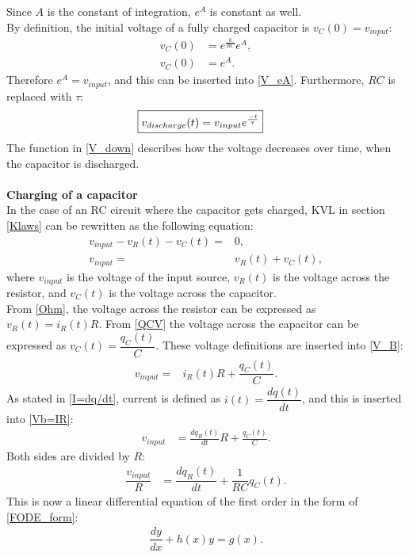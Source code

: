Since $A$ is the constant of integration, $e^A$ is constant as well.
\\
By definition, the initial voltage of a fully charged capacitor is $v_C(0)=v_{input}$:
 \begin{align*}
	v_C(0) &= e^{\frac{0}{RC}}e^A, \\
	v_C(0) &= e^A.
 \end{align*}
Therefore $e^A = v_{input}$, and this can be inserted into \eqref{V_eA}. Furthermore, $RC$ is replaced with $\tau$:
\begin{align}
\label{V_down}
\Aboxed{
 v_{discharge}(t) = v_{input}e^{\frac{-t}{\tau}}
 }
\end{align}
The function in \eqref{V_down} describes how the voltage decreases over time, when the capacitor is discharged.
\\
\\
\textbf{Charging of a capacitor}\\
In the case of an RC circuit where the capacitor gets charged, KVL in section \ref{Klaws} can be rewritten as the following equation:
\begin{align}
v_{input}-v_R(t)-v_C(t) =& 0, \nonumber \\
v_{input} =& v_R(t)+v_C(t), \label{V_B}
\end{align}
where $v_{input}$ is the voltage of the input source, $v_R(t)$ is the voltage across the resistor, and $v_C(t)$ is the voltage across the capacitor. 
\\
From \eqref{Ohm}, the voltage across the resistor can be expressed as $v_R(t)=i_{R}(t) R$. From \eqref{QCV} the voltage across the capacitor can be expressed as $v_C(t)=\dfrac{q_C (t)}{C}$. These voltage definitions are inserted into \eqref{V_B}:
\begin{align}
v_{input} =& i_{R}(t) R + \dfrac{q_C (t)}{C}. \label{Vb=IR}
\end{align}
As stated in \eqref{I=dq/dt}, current is defined as $i(t) =\dfrac{dq(t)}{dt}$, and this is inserted into \eqref{Vb=IR}:
 \begin{align*}
 	v_{input} &= \frac{dq_R(t)}{dt} R + \frac{q_C (t)}{C}.
 \end{align*}
Both sides are divided by $R$:
\begin{align}
\dfrac{v_{input}}{R} &= \dfrac{dq_R(t)}{dt} + \dfrac{1}{RC}q_C(t).\label{Vb/R} 
\end{align}
This is now a linear differential equation of the first order in the form of \eqref{FODE_form}:
\begin{align*}
\dfrac{dy}{dx}+h(x)y=g(x).
\end{align*}
